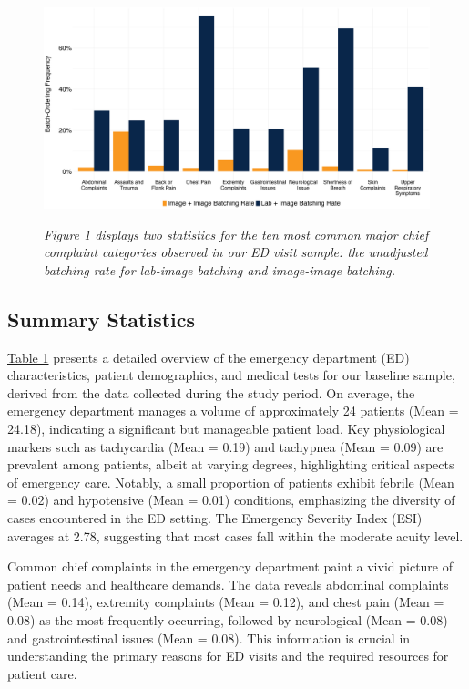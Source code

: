 \documentclass[,,nonblindrev]{informs}
\begin{document}
\begin{figure}[h]
  \centering
  \includegraphics[width=1\textwidth]{../outputs/figures/Lab and Image Batch Rates.png}
\begin{tablenotes}
\small
\item \textit{Figure 1 displays two statistics for the ten most common major chief complaint categories observed in our ED visit sample: the unadjusted batching rate for lab-image batching and image-image batching.}
\end{tablenotes}  
\end{figure}

\hypertarget{summary-statistics}{%
\subsection{Summary Statistics}\label{summary-statistics}}

\hyperref[tab:summary_statistics]{Table 1} presents a detailed overview
of the emergency department (ED) characteristics, patient demographics,
and medical tests for our baseline sample, derived from the data
collected during the study period. On average, the emergency department
manages a volume of approximately 24 patients (Mean = 24.18), indicating
a significant but manageable patient load. Key physiological markers
such as tachycardia (Mean = 0.19) and tachypnea (Mean = 0.09) are
prevalent among patients, albeit at varying degrees, highlighting
critical aspects of emergency care. Notably, a small proportion of
patients exhibit febrile (Mean = 0.02) and hypotensive (Mean = 0.01)
conditions, emphasizing the diversity of cases encountered in the ED
setting. The Emergency Severity Index (ESI) averages at 2.78, suggesting
that most cases fall within the moderate acuity level.

Common chief complaints in the emergency department paint a vivid
picture of patient needs and healthcare demands. The data reveals
abdominal complaints (Mean = 0.14), extremity complaints (Mean = 0.12),
and chest pain (Mean = 0.08) as the most frequently occurring, followed
by neurological (Mean = 0.08) and gastrointestinal issues (Mean = 0.08).
This information is crucial in understanding the primary reasons for ED
visits and the required resources for patient care.
\end{document}
